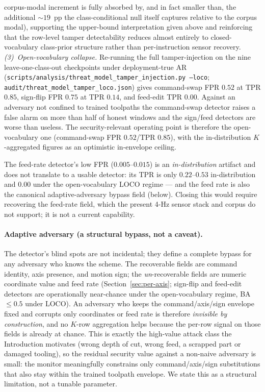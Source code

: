 \documentclass[sensors,article,submit,moreauthors,pdftex]{Definitions/mdpi}
\begin{document}
corpus-modal increment is fully absorbed by, and in fact smaller than, the additional $\sim\!19$~pp the class-conditional null itself captures relative to the corpus modal), supporting the upper-bound interpretation given above and reinforcing that the row-level tamper detectability reduces almost entirely to closed-vocabulary class-prior structure rather than per-instruction sensor recovery. \emph{(3)~Open-vocabulary collapse.} Re-running the full tamper-injection on the nine leave-one-class-out checkpoints under deployment-true AR (\texttt{scripts/analysis/threat\_model\_tamper\_injection.py --loco}; \texttt{audit/threat\_model\_tamper\_loco.json}) gives command-swap FPR $0.52$ at TPR $0.85$, sign-flip FPR $0.75$ at TPR $0.14$, and feed-edit TPR $0.00$. Against an adversary not confined to trained toolpaths the command-swap detector raises a false alarm on more than half of honest windows and the sign/feed detectors are worse than useless. The security-relevant operating point is therefore the open-vocabulary one (command-swap FPR $0.52$/TPR $0.85$), with the in-distribution $K$-aggregated figures as an optimistic in-envelope ceiling.

The feed-rate detector's low FPR ($0.005$--$0.015$) is an \emph{in-distribution} artifact and does not translate to a usable detector: its TPR is only $0.22$--$0.53$ in-distribution and $0.00$ under the open-vocabulary LOCO regime --- and the feed rate is also the canonical adaptive-adversary bypass field (below). Closing this would require recovering the feed-rate field, which the present 4-Hz sensor stack and corpus do not support; it is not a current capability.



\paragraph{Adaptive adversary (a structural bypass, not a caveat).} The detector's blind spots are not incidental; they define a complete bypass for any adversary who knows the scheme. The recoverable fields are command identity, axis presence, and motion sign; the \emph{un}-recoverable fields are numeric coordinate value and feed rate (Section~\ref{sec:per-axis}; sign-flip and feed-edit detectors are operationally near-chance under the open-vocabulary regime, BA $\le\!0.5$ under LOCO). An adversary who keeps the command/axis/sign envelope fixed and corrupts only coordinates or feed rate is therefore \emph{invisible by construction}, and no $K$-row aggregation helps because the per-row signal on those fields is already at chance. This is exactly the high-value attack class the Introduction motivates (wrong depth of cut, wrong feed, a scrapped part or damaged tooling), so the residual security value against a non-naive adversary is small: the monitor meaningfully constrains only command/axis/sign substitutions that also stay within the trained toolpath envelope. We state this as a structural limitation, not a tunable parameter.
\end{document}
